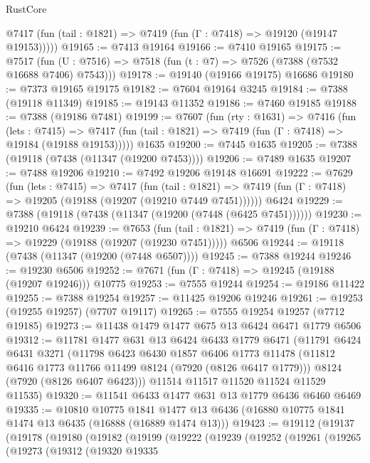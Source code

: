 \begin{lexlean}{RustCore}
\begin{coremodule}
      @7417 (fun (tail : @1821) => @7419 (fun (Γ : @7418) => @19120 (@19147 @19153)))))
@19165 := @7413 @19164
@19166 := @7410 @19165
@19175 := @7517
    (fun (U : @7516) => @7518 (fun (t : @7) => @7526 (@7388 (@7532 @16688 @7406) @7543)))
@19178 := @19140 (@19166 @19175) @16686
@19180 := @7373 @19165 @19175
@19182 := @7604 @19164 @3245
@19184 := @7388 (@19118 @11349)
@19185 := @19143 @11352
@19186 := @7460 @19185
@19188 := @7388 (@19186 @7481)
@19199 := @7607
    (fun (rty : @1631) =>
    @7416
      (fun (lets : @7415) =>
      @7417 (fun (tail : @1821) => @7419 (fun (Γ : @7418) => @19184 (@19188 @19153)))))
    @1635
@19200 := @7445 @1635
@19205 := @7388 (@19118 (@7438 (@11347 (@19200 @7453))))
@19206 := @7489 @1635
@19207 := @7488 @19206
@19210 := @7492 @19206 @19148 @16691
@19222 := @7629
    (fun (lets : @7415) =>
    @7417
      (fun (tail : @1821) =>
      @7419 (fun (Γ : @7418) => @19205 (@19188 (@19207 (@19210 @7449 @7451))))))
    @6424
@19229 := @7388 (@19118 (@7438 (@11347 (@19200 (@7448 (@6425 @7451))))))
@19230 := @19210 @6424
@19239 := @7653
    (fun (tail : @1821) => @7419 (fun (Γ : @7418) => @19229 (@19188 (@19207 (@19230 @7451)))))
    @6506
@19244 := @19118 (@7438 (@11347 (@19200 (@7448 @6507))))
@19245 := @7388 @19244
@19246 := @19230 @6506
@19252 := @7671 (fun (Γ : @7418) => @19245 (@19188 (@19207 @19246))) @10775
@19253 := @7555 @19244
@19254 := @19186 @11422
@19255 := @7388 @19254
@19257 := @11425 @19206 @19246
@19261 := @19253 (@19255 @19257) (@7707 @19117)
@19265 := @7555 @19254 @19257 (@7712 @19185)
@19273 := @11438 @1479 @1477 @675 @13 @6424 @6471 @1779 @6506
@19312 := @11781
    @1477
    @631
    @13
    @6424
    @6433
    @1779
    @6471
    (@11791
      @6424
      @6431
      @3271
      (@11798
        @6423
        @6430
        @1857
        @6406
        @1773
        @11478
        (@11812 @6416 @1773 @11766 @11499 @8124 (@7920 (@8126 @6417 @1779)))
        @8124
        (@7920 (@8126 @6407 @6423)))
      @11514
      @11517
      @11520
      @11524
      @11529
      @11535)
@19320 := @11541 @6433 @1477 @631 @13 @1779 @6436 @6460 @6469
@19335 := @10810
    @10775
    @1841
    @1477
    @13
    @6436
    (@16880 @10775 @1841 @1474 @13 @6435 (@16888 (@16889 @1474 @13)))
@19423 := @19112
    (@19137
      (@19178
        (@19180
          (@19182
            (@19199
              (@19222
                (@19239
                  (@19252
                    (@19261
                      (@19265
                        (@19273
                          (@19312
                            (@19320
                              @19335

\end{coremodule}
\end{lexlean}
